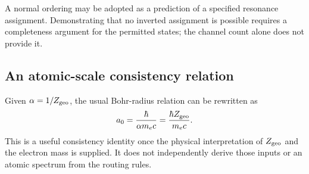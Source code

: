 A normal ordering may be adopted as a prediction of a specified resonance assignment. Demonstrating that no inverted assignment is possible requires a completeness argument for the permitted states; the channel count alone does not provide it.

\subsection{An atomic-scale consistency relation}
Given $\alpha=1/Z_{\rm geo}$, the usual Bohr-radius relation can be rewritten as
\begin{equation}
a_0=\frac{\hbar}{\alpha m_ec}
=\frac{\hbar Z_{\rm geo}}{m_ec}.
\end{equation}
This is a useful consistency identity once the physical interpretation of $Z_{\rm geo}$ and the electron mass is supplied. It does not independently derive those inputs or an atomic spectrum from the routing rules.
